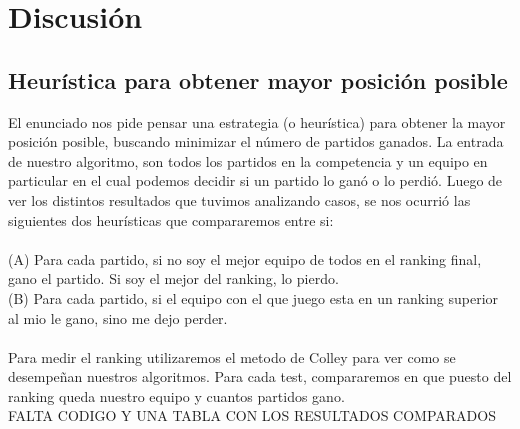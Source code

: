 \section{Discusi\'on}

\subsection{Heur\'istica para obtener mayor posici\'on posible}

El enunciado nos pide pensar una estrategia (o heur\'istica) para obtener la mayor posici\'on posible, buscando minimizar el n\'umero de partidos ganados. La entrada de nuestro algoritmo, son todos los partidos en la competencia y un equipo en particular en el cual podemos decidir si un partido lo gan\'o o lo perdi\'o. Luego de ver los distintos resultados que tuvimos analizando casos, se nos ocurri\'o las siguientes dos heur\'isticas que compararemos entre si:\\
\\
(A) Para cada partido, si no soy el mejor equipo de todos en el ranking final, gano el partido. Si soy el mejor del ranking, lo pierdo.\\
(B) Para cada partido, si el equipo con el que juego esta en un ranking superior al mio le gano, sino me dejo perder.\\
\\
Para medir el ranking utilizaremos el metodo de Colley para ver como se desempe\~nan nuestros algoritmos. Para cada test, compararemos en que puesto del ranking queda nuestro equipo y cuantos partidos gano.\\
FALTA CODIGO Y UNA TABLA CON LOS RESULTADOS COMPARADOS\\